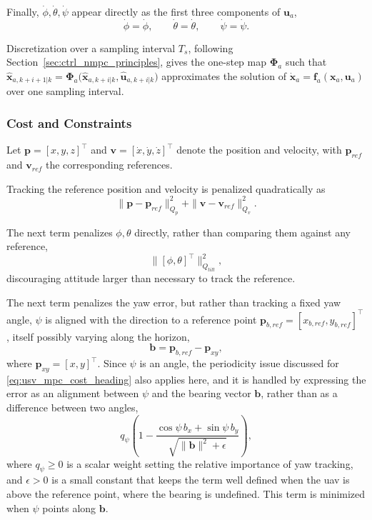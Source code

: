 Finally, $\dot\phi,\dot\theta,\dot\psi$ appear directly as the first three components of $\mathbf{u}_a$,
\begin{equation}
    \dot\phi = \dot\phi, \qquad \dot\theta = \dot\theta, \qquad \dot\psi = \dot\psi.
    \label{eq:uav_mpc_attitude_rates}
\end{equation}

Discretization over a sampling interval $T_s$, following Section~\ref{sec:ctrl_nmpc_principles}, gives the one-step map $\boldsymbol\Phi_a$ such that $\hat{\mathbf{x}}_{a,k+i+1|k} = \boldsymbol\Phi_a\big(\hat{\mathbf{x}}_{a,k+i|k},\hat{\mathbf{u}}_{a,k+i|k}\big)$ approximates the solution of $\dot{\mathbf{x}}_a = \mathbf{f}_a(\mathbf{x}_a,\mathbf{u}_a)$ over one sampling interval.

\subsubsection*{Cost and Constraints}

Let $\mathbf{p} = [x,y,z]^\top$ and $\mathbf{v} = [\dot x,\dot y,\dot z]^\top$ denote the position and velocity, with $\mathbf{p}_{ref}$ and $\mathbf{v}_{ref}$ the corresponding references.

Tracking the reference position and velocity is penalized quadratically as
\begin{equation}
    \|\mathbf{p}-\mathbf{p}_{ref}\|^2_{Q_p} + \|\mathbf{v}-\mathbf{v}_{ref}\|^2_{Q_v}.
    \label{eq:uav_mpc_cost_track}
\end{equation}

The next term penalizes $\phi,\theta$ directly, rather than comparing them against any reference,
\begin{equation}
    \big\|[\phi,\theta]^\top\big\|^2_{Q_{tilt}},
    \label{eq:uav_mpc_cost_tilt}
\end{equation}
discouraging attitude larger than necessary to track the reference.

The next term penalizes the yaw error, but rather than tracking a fixed yaw angle, $\psi$ is aligned with the direction to a reference point $\mathbf{p}_{b,ref} = [x_{b,ref},y_{b,ref}]^\top$, itself possibly varying along the horizon,
\begin{equation}
    \mathbf{b} = \mathbf{p}_{b,ref} - \mathbf{p}_{xy},
    \label{eq:uav_mpc_yaw_direction}
\end{equation}
where $\mathbf{p}_{xy}=[x,y]^\top$. Since $\psi$ is an angle, the periodicity issue discussed for \eqref{eq:usv_mpc_cost_heading} also applies here, and it is handled by expressing the error as an alignment between $\psi$ and the bearing vector $\mathbf{b}$, rather than as a difference between two angles,
\begin{equation}
    q_\psi\left(1 - \frac{\cos\psi\,b_x + \sin\psi\,b_y}{\sqrt{\|\mathbf{b}\|^2 + \epsilon}}\right),
    \label{eq:uav_mpc_cost_yaw}
\end{equation}
where $q_\psi \ge 0$ is a scalar weight setting the relative importance of yaw tracking, and $\epsilon > 0$ is a small constant that keeps the term well defined when the \gls{uav} is above the reference point, where the bearing is undefined. This term is minimized when $\psi$ points along $\mathbf{b}$.

